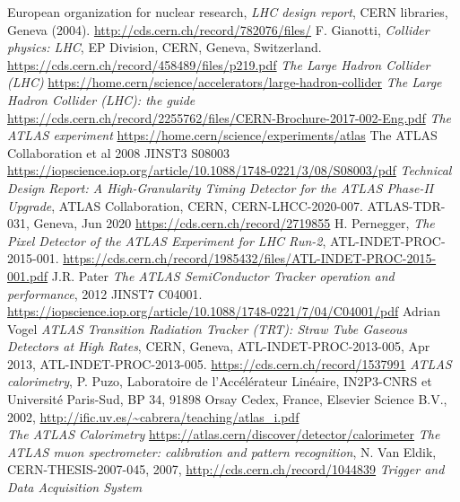 \documentclass[a4paper, oneside, 11pt, openright]{book}
\begin{document}
\begin{thebibliography}{32}
			 European organization for nuclear research, \textit{LHC design report}, CERN libraries, Geneva (2004). \url{http://cds.cern.ch/record/782076/files/}
			 F. Gianotti, \textit{Collider physics: LHC}, EP Division, CERN, Geneva, Switzerland. \url{https://cds.cern.ch/record/458489/files/p219.pdf}
			\textit{The Large Hadron Collider (LHC)}
			\url{https://home.cern/science/accelerators/large-hadron-collider}
			\textit{The Large Hadron Collider (LHC): the guide}
			\url{https://cds.cern.ch/record/2255762/files/CERN-Brochure-2017-002-Eng.pdf}
			\textit{The ATLAS experiment}
			\url{https://home.cern/science/experiments/atlas}
			  The ATLAS Collaboration et al 2008 JINST3 S08003
			\url{https://iopscience.iop.org/article/10.1088/1748-0221/3/08/S08003/pdf}
			\textit{Technical Design Report:  A High-Granularity Timing Detector for the ATLAS Phase-II Upgrade}, ATLAS Collaboration, CERN, CERN-LHCC-2020-007. ATLAS-TDR-031, Geneva, Jun 2020
			\url{https://cds.cern.ch/record/2719855}
			 H. Pernegger, \textit{The Pixel Detector of the ATLAS Experiment for LHC Run-2}, ATL-INDET-PROC-2015-001. \url{https://cds.cern.ch/record/1985432/files/ATL-INDET-PROC-2015-001.pdf}
			 J.R. Pater \textit{The ATLAS SemiConductor Tracker operation and performance}, 2012 JINST7 C04001. \url{https://iopscience.iop.org/article/10.1088/1748-0221/7/04/C04001/pdf}
			 Adrian Vogel \textit{ATLAS Transition Radiation Tracker (TRT): Straw Tube Gaseous Detectors at High Rates}, CERN,
			Geneva, ATL-INDET-PROC-2013-005, Apr 2013, ATL-INDET-PROC-2013-005. \url{https://cds.cern.ch/record/1537991}
			\textit{ATLAS calorimetry}, P. Puzo, Laboratoire de l’Accélérateur Linéaire, IN2P3-CNRS et Université Paris-Sud, BP 34, 91898 Orsay Cedex, France, Elsevier Science B.V., 2002,
			\url{http://ific.uv.es/~cabrera/teaching/atlas_i.pdf}\\
			\textit{The ATLAS Calorimetry}
			\url{https://atlas.cern/discover/detector/calorimeter}
			\textit{The ATLAS muon spectrometer: calibration and pattern recognition}, N. Van Eldik, CERN-THESIS-2007-045, 2007,
			\url{http://cds.cern.ch/record/1044839}
			\textit{Trigger and Data Acquisition System}

\end{thebibliography}
\end{document}
